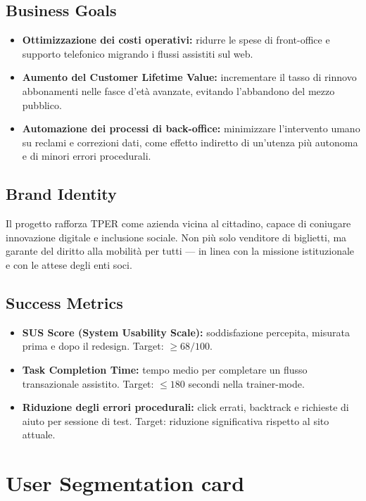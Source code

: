 ﻿\documentclass[11pt,a4paper]{article}
\begin{document}
\subsection{Business Goals}
\begin{itemize}[leftmargin=*]
\item \textbf{Ottimizzazione dei costi operativi:} ridurre le spese di
front-office e supporto telefonico migrando i flussi assistiti sul web.
\item \textbf{Aumento del Customer Lifetime Value:} incrementare il tasso
di rinnovo abbonamenti nelle fasce d'età avanzate, evitando l'abbandono
del mezzo pubblico.
\item \textbf{Automazione dei processi di back-office:} minimizzare
l'intervento umano su reclami e correzioni dati, come effetto indiretto
di un'utenza più autonoma e di minori errori procedurali.
\end{itemize}

\subsection{Brand Identity}
Il progetto rafforza TPER come azienda vicina al cittadino, capace di
coniugare innovazione digitale e inclusione sociale. Non più solo venditore
di biglietti, ma garante del diritto alla mobilità per tutti --- in linea con
la missione istituzionale e con le attese degli enti soci.

\subsection{Success Metrics}
\begin{itemize}[leftmargin=*]
    \item \textbf{SUS Score (System Usability Scale):}
    soddisfazione percepita, misurata prima e dopo il redesign.
    Target: $\geq 68/100$.

    \item \textbf{Task Completion Time:}
    tempo medio per completare un flusso transazionale assistito.
    Target: $\leq 180$ secondi nella trainer-mode.

    \item \textbf{Riduzione degli errori procedurali:}
    click errati, backtrack e richieste di aiuto per sessione di test.
    Target: riduzione significativa rispetto al sito attuale.
\end{itemize}

\newpage
\section{User Segmentation card}
\end{document}
